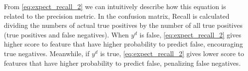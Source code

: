 From \eqref{eq:expect_recall_2} we can intuitively describe how this equation is related to the precision metric. In the confusion matrix, Recall is calculated dividing the numbers of actual true positives by the number of all true positives (true positives and false negatives). When $y^d$ is false, \eqref{eq:expect_recall_2} gives higher score to feature that have higher probability to predict false, encouraging true negatives. Meanwhile, if $y^d$ is true, \eqref{eq:expect_recall_2} gives lower score to features that have higher probability to predict false, penalizing false negatives.


